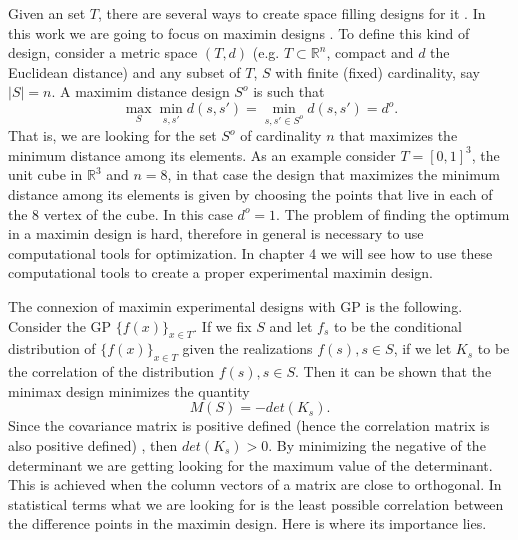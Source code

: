 \documentclass[12pt]{book}
\begin{document}
Given an set $T$, there are several ways to create space filling designs for it 
\cite{pronzato2012design}. In this work we are going to focus on maximin designs
\cite{johnson1990minimax}. To define this kind of design, consider a metric space $(T,d)$ (e.g.
$T\subset\mathbb{R}^{n}$, compact and $d$ the Euclidean distance) and any subset of $T$, 
$S$ with finite (fixed) cardinality, say $|S|=n$.
A maximim distance design $S^{o}$ is such that
\begin{equation*}
\max_{S}\min_{s,s'}d(s,s')=\min_{s,s'\in S^{o}}d(s,s')=d^{o}.
\end{equation*}
That is, we are looking for the set $S^{o}$ of cardinality $n$ that maximizes the minimum distance among 
its elements. As an example consider $T=[0,1]^{3}$, the unit cube in $\mathbb{R}^{3}$ and $n=8$, in 
that case the design that maximizes the minimum distance among its elements is given by choosing
the points that live in each of the 8 vertex of the cube. In this case $d^{o}=1$. The problem of finding
the optimum in a maximin design is hard, therefore in general is necessary to use computational tools
for optimization. In chapter 4 we will see how to use these computational tools to create
a proper experimental maximin design.

The connexion of maximin experimental designs with GP is the following. Consider the
GP $\{f(x)\}_{x\in T}$. If we fix $S$ and let $f_{s}$ to be the conditional distribution 
of $\{f(x)\}_{x\in T}$ given the realizations $f(s), s\in S$, if we let $K_{s}$ to be 
the correlation of the distribution $f(s), s\in S$. Then it can be shown
that the minimax design minimizes the quantity
\begin{equation*}
M(S)=-det(K_{s}).
\end{equation*}
Since the covariance matrix is positive defined (hence the correlation matrix is also positive defined)
, then $det(K_{s})>0$. By minimizing the  negative of the determinant  we are getting looking
for the maximum value of the determinant. This is achieved when the column vectors of a matrix
are close to orthogonal. In statistical terms what we are looking for is 
the least possible correlation between the difference points in the maximin design. Here
is where its importance lies.
\newline
\end{document}
